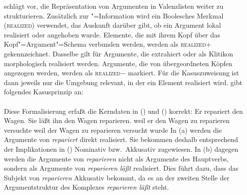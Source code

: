 \prz schlägt vor, die Repräsentation von Argumenten in Valenzlisten
weiter zu strukturieren. Zusätzlich zur "=Information wird
ein Boolesches Merkmal (\textsc{realized}\label{page-realized}) verwendet,
das Auskunft darüber gibt, ob ein Argument lokal realisiert 
oder angehoben wurde. Elemente, die mit ihrem Kopf über das Kopf"=Argument"=Schema
verbunden werden, werden als \textsc{realized}+ gekennzeichnet. Dasselbe gilt
für Argumente, die extrahiert oder als Klitikon
morphologisch realisiert werden.
Argumente, die von übergeordneten Köpfen angezogen werden, werden als
\textsc{realized}$-$ markiert. Für die Kasuszuweisung ist dann jeweils nur
die Umgebung relevant, in der ein Element realisiert wird.
\citet[]{Prze99} gibt folgendes Kasusprinzip an:
\eal
\label{case-prz}
\ex {} \impl \\
    \mbox{}\hspace{3cm}
\ex {} \impl \\
    \mbox{}\hspace{3cm}
\zl
Diese Formalisierung erfaßt die Kerndaten in () und () korrekt:
\eal
\ex Er repariert den Wagen.
\ex Sie läßt ihn den Wagen reparieren.
\zl
\eal
\ex weil er den Wagen zu reparieren versuchte
\ex weil der Wagen zu reparieren versucht wurde
\zl
In (a) werden die Argumente von \emph{repariert} direkt realisiert.
Sie bekommen deshalb entsprechend der Implikationen in () Nominativ
bzw.\ Akkusativ zugewiesen. In (b) dagegen werden die Argumente von
\emph{reparieren} nicht als Argumente des Hauptverbs, sondern als Argumente
von \emph{reparieren läßt} realisiert. Dies führt dazu, dass das Subjekt
von \emph{reparieren} Akkusativ bekommt, da es an der zweiten Stelle
der Argumentstruktur des Komplexes \emph{reparieren läßt} steht.

